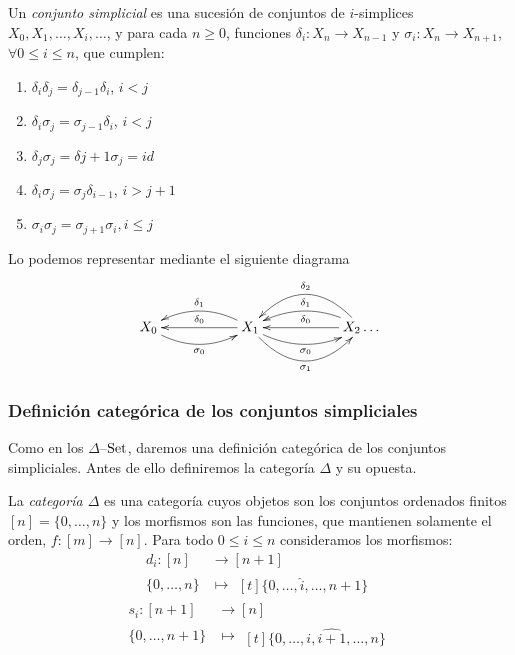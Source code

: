 \documentclass[../main.tex]{subfiles}
\begin{document}
\newpage
\begin{defi}
    Un \emph{conjunto simplicial} es una sucesi\'on de conjuntos de $i$-simplices $X_0,X_1,\dots,X_i,\dots$, y para cada $n\ge 0$, funciones $\delta_i: X_n \to X_{n-1}$ y $\sigma_i: X_n \to X_{n+1}$, $\forall 0\le i \le n$, que cumplen:

    \begin{enumerate}[(1)]
        \item $\delta_i\delta_j = \delta_{j-1}\delta_{i}$, $i<j$
        \item $\delta_i\sigma_j = \sigma_{j-1}\delta_{i}$, $i<j$
        \item $\delta_j\sigma_j = \delta{j+1}\sigma_{j} = id$
        \item $\delta_i\sigma_j = \sigma_{j}\delta_{i-1}$, $i>j+1$
        \item $\sigma_i\sigma_j = \sigma_{j+1}\sigma_{i}, i\le j$
    \end{enumerate}
    Lo podemos representar mediante el siguiente diagrama
    $$
        \xymatrix{
        X_0 \ar@/{}_{1pc}/[rr]_{\sigma_0} & & X_1 \ar@/{}_{1pc}/[rr]_{\sigma_0} \ar@/{}_{2pc}/[rr]_{\sigma_1} \ar@/{}_{1pc}/[ll]_{\delta_1} \ar[ll]_{\delta_0} & & X_2 \ar@/{}_{2pc}/[ll]_{\delta_2} \ar@/{}_{1pc}/[ll]_{\delta_1} \ar[ll]_{\delta_0} \dots
        }
    $$
\end{defi}

\subsubsection{Definici\'on categ\'orica de los conjuntos simpliciales}
Como en los $\Delta$--$\mathop{\rm Set}$, daremos una definici\'on categ\'orica de los conjuntos simpliciales. Antes de ello definiremos la categor\'ia $\Delta$ y su opuesta.
\begin{defi}
    La \emph{categor\'ia $\Delta$} es una categor\'ia cuyos objetos son los conjuntos ordenados finitos $[n] = \{0,\dots,n\}$ y los morfismos son las funciones, que mantienen solamente el orden, $f\colon [m] \to [n]$.
    Para todo $0\le i \le n$ consideramos los morfismos:
    \begin{align*}
        d_i: [n]      & \longrightarrow [n+1] \\
        \{0,\dots,n\} & \longmapsto\!
        \begin{aligned}[t]
            \{0,\dots, \hat{i}, \dots,n+1\}
        \end{aligned}
    \end{align*}
    \begin{align*}
        s_i: [n+1]      & \longrightarrow [n] \\
        \{0,\dots,n+1\} & \longmapsto\!
        \begin{aligned}[t]
            \{0,\dots,i,\widehat{i+1}, \dots,n\}
        \end{aligned}
    \end{align*}
\end{defi}
\end{document}
